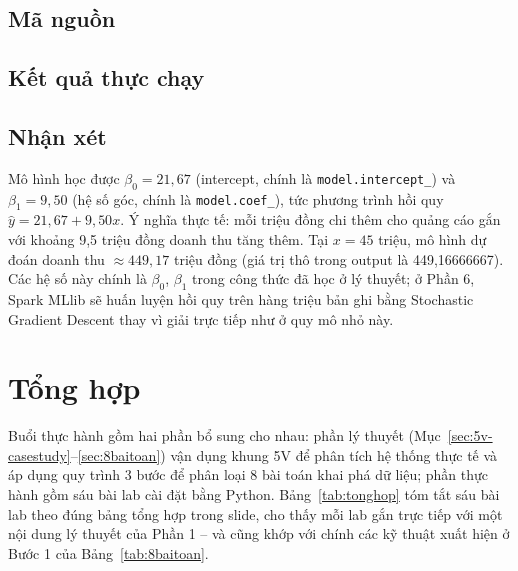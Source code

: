 \documentclass[12pt,a4paper,oneside]{article}
\begin{document}
\subsection{Mã nguồn}



\subsection{Kết quả thực chạy}



\subsection{Nhận xét}

Mô hình học được $\beta_0 = 21{,}67$ (intercept, chính là \texttt{model.intercept\_}) và $\beta_1 = 9{,}50$ (hệ số góc, chính là \texttt{model.coef\_}), tức phương trình hồi quy $\hat{y} = 21{,}67 + 9{,}50x$. Ý nghĩa thực tế: mỗi triệu đồng chi thêm cho quảng cáo gắn với khoảng 9{,}5 triệu đồng doanh thu tăng thêm. Tại $x = 45$ triệu, mô hình dự đoán doanh thu $\approx 449{,}17$ triệu đồng (giá trị thô trong output là 449{,}16666667). Các hệ số này chính là $\beta_0$, $\beta_1$ trong công thức đã học ở lý thuyết; ở Phần 6, Spark MLlib sẽ huấn luyện hồi quy trên hàng triệu bản ghi bằng Stochastic Gradient Descent thay vì giải trực tiếp như ở quy mô nhỏ này.

\section{Tổng hợp}

Buổi thực hành gồm hai phần bổ sung cho nhau: phần lý thuyết (Mục~\ref{sec:5v-casestudy}--\ref{sec:8baitoan}) vận dụng khung 5V để phân tích hệ thống thực tế và áp dụng quy trình 3 bước để phân loại 8 bài toán khai phá dữ liệu; phần thực hành gồm sáu bài lab cài đặt bằng Python. Bảng~\ref{tab:tonghop} tóm tắt sáu bài lab theo đúng bảng tổng hợp trong slide, cho thấy mỗi lab gắn trực tiếp với một nội dung lý thuyết của Phần 1 -- và cũng khớp với chính các kỹ thuật xuất hiện ở Bước 1 của Bảng~\ref{tab:8baitoan}.
\end{document}
